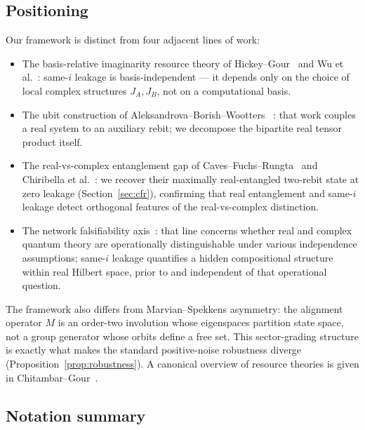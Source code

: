 \documentclass[a4paper,onecolumn,noarxiv]{quantumarticle}
\theoremstyle{plain}
\theoremstyle{definition}
\theoremstyle{remark}
\newcommand{\Mop}{M}
\begin{document}
\subsection{Positioning}
\label{ssec:positioning}

Our framework is distinct from four adjacent lines of work:
\begin{itemize}
\item The basis-relative imaginarity resource theory of Hickey--Gour~%
  \cite{HickeyGour2018} and Wu et al.~\cite{Wu2021Imaginarity,Wu2024Distributed}:
  same-$i$ leakage is basis-independent --- it depends only on the choice of local
  complex structures $J_A,J_B$, not on a computational basis.
\item The ubit construction of Aleksandrova--Borish--Wootters~%
  \cite{AleksandrovaBorishWootters2013}: that work couples a real system to an
  auxiliary rebit; we decompose the bipartite real tensor product itself.
\item The real-vs-complex entanglement gap of Caves--Fuchs--Rungta~%
  \cite{CavesFuchsRungta2001} and Chiribella et al.~\cite{ChiribellaDePalmaRinaldi2023}:
  we recover their maximally real-entangled two-rebit state at zero leakage
  (Section~\ref{sec:cfr}), confirming that real entanglement and same-$i$ leakage
  detect orthogonal features of the real-vs-complex distinction.
\item The network falsifiability axis~\cite{Renou2021RealQT,HoffreumonWoods2025,%
  HoffreumonWoodsNonFalsified,WeilenmannGisinSekatski2025}: that line concerns
  whether real and complex quantum theory are operationally distinguishable under
  various independence assumptions; same-$i$ leakage quantifies a hidden
  compositional structure within real Hilbert space, prior to and independent of
  that operational question.
\end{itemize}
The framework also differs from Marvian--Spekkens asymmetry: the alignment
operator $\Mop$ is an order-two involution whose eigenspaces partition state space,
not a group generator whose orbits define a free set. This sector-grading structure
is exactly what makes the standard positive-noise robustness diverge
(Proposition~\ref{prop:robustness}). A canonical overview of resource theories is
given in Chitambar--Gour~\cite{ChitambarGour2019}.

\subsection{Notation summary}
\label{ssec:notation}
\end{document}
